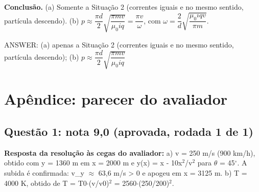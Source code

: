 \documentclass{article}%
\begin{document}
\textbf{Conclusão.} (a) Somente a Situação 2 (correntes iguais e no mesmo sentido, partícula descendo). (b) $p\approx\dfrac{\pi d}{2}\sqrt{\dfrac{\pi m v}{\mu_0 i q}}=\dfrac{\pi v}{\omega}$, com $\omega=\dfrac{2}{d}\sqrt{\dfrac{\mu_0 i q v}{\pi m}}$.

ANSWER: (a) apenas a Situação 2 (correntes iguais e no mesmo sentido, partícula descendo); (b) $p\approx\dfrac{\pi d}{2}\sqrt{\dfrac{\pi m v}{\mu_0 i q}}$%
\newpage%
\section*{Apêndice: parecer do avaliador}%
\subsection*{Questão 1: nota 9,0 (aprovada, rodada 1 de 1)}%
\textbf{Resposta da resolução às cegas do avaliador:} a) v = 250 m/s (900 km/h), obtido com y = 1360 m em x = 2000 m e y(x) = x - 10x$^2$/v$^2$ para $\theta$ = 45$^\circ$. A subida é confirmada: v\_y $\approx$ 63,6 m/s > 0 e apogeu em x = 3125 m.\newline%
\newline%
b) T = 4000 K, obtido de T = T0$\cdot$(v/v0)$^2$ = 2560$\cdot$(250/200)$^2$.\newline%
\newline%
\end{document}
